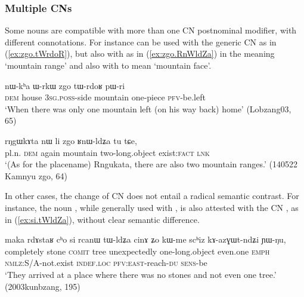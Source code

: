 \subsubsection{Multiple CNs}
Some nouns are compatible with more than one CN postnominal modifier, with different connotations. For instance  can be used with the generic CN  as in (\ref{ex:zgo.tWrdoR}), but also with    as in (\ref{ex:zgo.RnWldZa}) in the meaning `mountain range' and also with  to mean `mountain face'.

\begin{exe}
\ex \label{ex:zgo.tWrdoR}
\gll nɯ-kʰa ɯ-rkɯ zgo tɯ-rdoʁ pɯ-ri \\
\textsc{dem} house \textsc{3sg}.\textsc{poss}-side mountain one-piece \textsc{pfv}-be.left  \\
\glt `When there was only one mountain left (on his way back) home' (Lobzang03, 65)
\end{exe}

\begin{exe}
\ex \label{ex:zgo.RnWldZa}
\gll rŋgɯkɤta nɯ li zgo ʁnɯ-ldʑa tu tɕe, \\
pl.n. \textsc{dem} again mountain two-long.object exist:\textsc{fact} \textsc{lnk} \\
\glt `(As for the placename) Rngukata, there are also two mountain ranges.' (140522 Kamnyu zgo, 64)
\end{exe}

In other cases, the change of CN does not entail a radical semantic contrast. For instance, the noun , while generally used with , is also attested with the CN , as in (\ref{ex:si.tWldZa}), without clear semantic difference.

\begin{exe}
\ex \label{ex:si.tWldZa}
\gll maka rdɤstaʁ cʰo si rcanɯ tɯ-ldʑa cinɤ ʑo kɯ-me scʰiz kɤ-azɣɯt-ndʑi ɲɯ-ŋu, \\
completely stone \textsc{comit} tree unexpectedly one-long.object even.one \textsc{emph} \textsc{nmlz}:S/A-not.exist \textsc{indef}.\textsc{loc} \textsc{pfv}:\textsc{east}-reach-\textsc{du} \textsc{sens}-be  \\
\glt `They arrived at a place where there was no stones and not even one tree.' (2003kunbzang, 195)
\end{exe}




